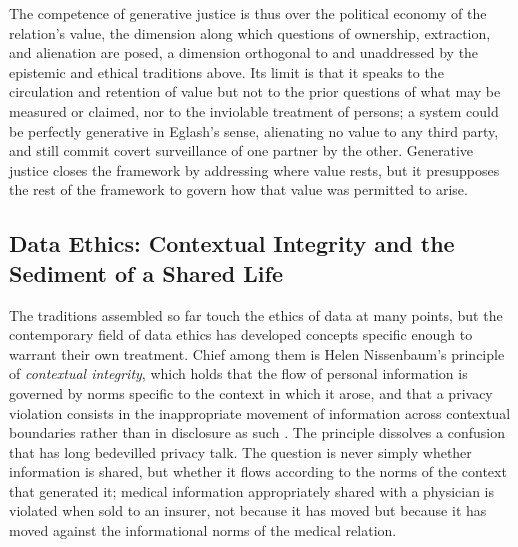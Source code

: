 The competence of generative justice is thus over the political economy of the relation's value, the dimension along which questions of ownership, extraction, and alienation are posed, a dimension orthogonal to and unaddressed by the epistemic and ethical traditions above. Its limit is that it speaks to the circulation and retention of value but not to the prior questions of what may be measured or claimed, nor to the inviolable treatment of persons; a system could be perfectly generative in Eglash's sense, alienating no value to any third party, and still commit covert surveillance of one partner by the other. Generative justice closes the framework by addressing where value rests, but it presupposes the rest of the framework to govern how that value was permitted to arise.

\subsection{Data Ethics: Contextual Integrity and the Sediment of a Shared Life}\label{p01:sec:dataethics}

The traditions assembled so far touch the ethics of data at many points, but the contemporary field of data ethics has developed concepts specific enough to warrant their own treatment. Chief among them is Helen Nissenbaum's principle of \emph{contextual integrity}, which holds that the flow of personal information is governed by norms specific to the context in which it arose, and that a privacy violation consists in the inappropriate movement of information across contextual boundaries rather than in disclosure as such \parencite{nissenbaum2010privacy}. The principle dissolves a confusion that has long bedevilled privacy talk. The question is never simply whether information is shared, but whether it flows according to the norms of the context that generated it; medical information appropriately shared with a physician is violated when sold to an insurer, not because it has moved but because it has moved against the informational norms of the medical relation.

